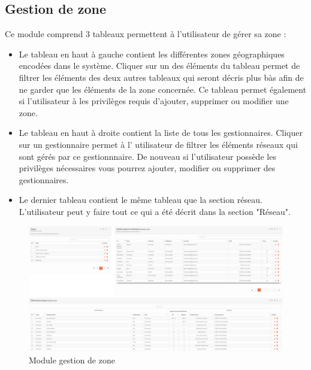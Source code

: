\documentclass{EPL-master-thesis-covers-FR}
\begin{document}
			\subsection{Gestion de zone}
				Ce module comprend 3 tableaux permettent à l'utilisateur de gérer sa zone :
				\begin{itemize}
					\item Le tableau en haut à gauche contient les différentes zones géographiques encodées dans le système. Cliquer sur un des éléments du tableau permet de filtrer les éléments des deux autres tableaux qui seront décris plus bàs afin de ne garder que les éléments de la zone concernée. Ce tableau permet également si l'utilisateur à les privilèges requis d'ajouter, supprimer ou modifier une zone.
					\item Le tableau en haut à droite contient la liste de tous les gestionnaires. Cliquer sur un gestionnaire permet à l' utilisateur de filtrer les éléments réseaux qui sont gérés par ce gestionnnaire. De nouveau si l'utilisateur possède les privilèges nécessaires vous pourrez ajouter, modifier ou supprimer des gestionnaires.
					\item Le dernier tableau contient le même tableau que la section réseau. L'utilisateur peut y faire tout ce qui a été décrit dans la section "Réseau".
				\end{itemize}
				\begin{figure}[H]
					\centering
					\includegraphics[width=1\textwidth]{images/gestion}
					\caption{Module gestion de zone}
				\end{figure}
			
\end{document}
